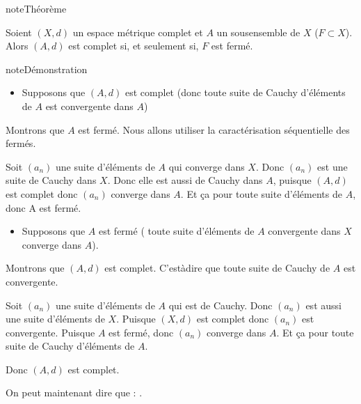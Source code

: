 \documentclass[letterpaper,10pt,french]{sphinxmanual}
\begin{document}
\begin{sphinxadmonition}{note}{Théorème}

\sphinxAtStartPar
Soient \((X,d)\) un espace métrique complet et \(A\) un sous\sphinxhyphen{}ensemble de \(X\) (\(F\subset X\)). Alors \((A,d)\) est complet si, et seulement si, \(F\) est fermé.
\end{sphinxadmonition}

\begin{sphinxadmonition}{note}{Démonstration}
\begin{itemize}
\item {} 
\sphinxAtStartPar
Supposons que \((A,d)\) est complet (donc toute suite de Cauchy d’éléments de \(A\) est convergente dans \(A\))

\end{itemize}

\sphinxAtStartPar
Montrons que \(A\) est fermé. Nous allons utiliser la caractérisation séquentielle des fermés.

\sphinxAtStartPar
Soit \((a_n)\) une suite d’éléments de \(A\) qui converge dans \(X\). Donc \((a_n)\) est une suite de Cauchy dans \(X\). Donc elle est aussi de Cauchy dans \(A\), puisque \((A,d)\) est complet donc \((a_n)\) converge dans \(A\). Et ça pour toute suite d’éléments de \(A\), donc A est fermé.
\begin{itemize}
\item {} 
\sphinxAtStartPar
Supposons que \(A\)  est fermé ( toute suite d’éléments de \(A\) convergente dans \(X\) converge dans \(A\)).

\end{itemize}

\sphinxAtStartPar
Montrons que \((A,d)\) est complet. C’est\sphinxhyphen{}à\sphinxhyphen{}dire que toute suite de Cauchy de \(A\) est convergente.

\sphinxAtStartPar
Soit \((a_n)\) une suite d’éléments de \(A\)  qui est de Cauchy. Donc \((a_n)\) est aussi une suite d’éléments de \(X\). Puisque \((X,d)\) est complet donc \((a_n)\) est convergente. Puisque \(A\) est fermé, donc \((a_n)\) converge dans \(A\). Et ça pour toute suite de Cauchy d’éléments de \(A\).

\sphinxAtStartPar
Donc \((A, d)\) est complet.
\end{sphinxadmonition}

\sphinxAtStartPar
On peut maintenant dire que : .
\end{document}
